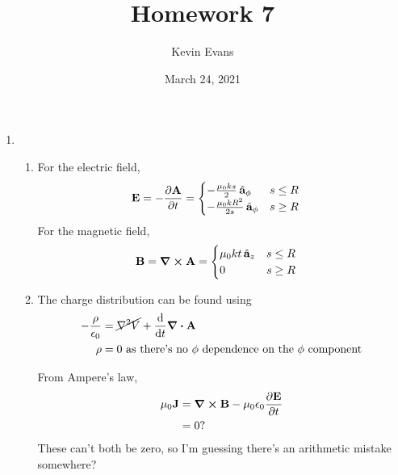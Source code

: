 \documentclass{homework}
\title{Homework 7}
\author{Kevin Evans}
\date{March 24, 2021}
\begin{document}
	\maketitle
	\begin{enumerate}
		\item \begin{enumerate}
			\item For the electric field, \begin{align*}
				\boldsymbol{\mathrm{E}} & = -\pdv{ \boldsymbol{\mathrm{A}} }{t} = \begin{cases}
					-\frac{\mu_0 k s}{2} \thinspace\hat{ \mathbf{a}}_{\phi} & s \le R \\
					-\frac{\mu_0 k R^2}{2s} \thinspace\hat{ \mathbf{a}}_{\phi} & s \ge R
				\end{cases}
				\end{align*}
				For the magnetic field, \begin{align*}
					\boldsymbol{\mathrm{B}} & = \curl{ \boldsymbol{\mathrm{A}} }  = \begin{cases}
						 {\mu_0 k t} \thinspace\hat{ \mathbf{a}}_{z} & s \le R \\
						 0 & s \ge R
					\end{cases}
				\end{align*}
			
			\item The charge distribution can be found using \begin{align*}
				-\frac{\rho}{\epsilon_0} & = \cancel{ \laplacian{V} } + \dv{t} \div{\bvec{A}} \\
				\rho & = 0 \text{ as there's no $\phi$ dependence on the $\phi$ component}
			\end{align*}
		
			From Ampere's law, \begin{align*}
				\mu_0 \boldsymbol{\mathrm{J}} & = \curl{ \boldsymbol{\mathrm{B}} } - \mu_0 \epsilon_0 \pdv{ \boldsymbol{\mathrm{E}} }{t} \\
					& = 0?
			\end{align*}
			These can't both be zero, so I'm guessing there's an arithmetic mistake somewhere?


\end{enumerate}
\end{enumerate}
\end{document}
